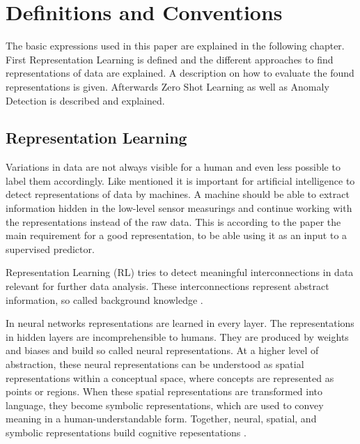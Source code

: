 \section{Definitions and Conventions}\label{theory}
The basic expressions used in this paper are explained in the following chapter. First Representation Learning is defined and the different approaches to find representations of data are explained. A description on how to evaluate the found representations is given. Afterwards Zero Shot Learning as well as Anomaly Detection is described and explained.
\subsection{Representation Learning}
Variations in data are not always visible for a human and even less possible to label them accordingly. Like \cite{bengio_representation_2013} mentioned it is important for artificial intelligence to detect representations of data by machines. A machine should be able to extract information hidden in the low-level sensor measurings and continue working with the representations instead of the raw data. This is according to the paper the main requirement for a good representation, to be able using it as an input to a supervised predictor.

Representation Learning (RL) tries to detect meaningful interconnections in data relevant for further data analysis. These interconnections represent abstract information, so called background knowledge \cite{lavrac_representation_2021}.

In neural networks representations are learned in every layer. The representations in hidden layers are incomprehensible to humans. They are produced by weights and biases and build so called neural representations. At a higher level of abstraction, these neural representations can be understood as spatial representations within a conceptual space, where concepts are represented as points or regions. When these spatial representations are transformed into language, they become symbolic representations, which are used to convey meaning in a human-understandable form. Together, neural, spatial, and symbolic representations build cognitive repesentations \cite{gardenfors_conceptual_2000}.


